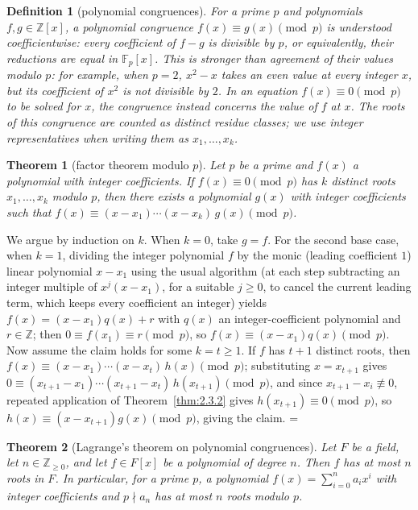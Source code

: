 \documentclass[11pt]{article}
\makeatletter
\theoremstyle{ntstyle}
\newtheorem{theorem}{Theorem}[subsection]
\newtheorem{definition}{Definition}[subsection]
\let\nt@closedisplay\]
\def\nt@guardedclose{\@ifnextchar\par{\nt@closeafterpar}{\@ifnextchar\end{\postdisplaypenalty\@M\nt@closedisplay}{\nt@closedisplay}}}
\def\nt@closeafterpar\par{\@ifnextchar\par{\nt@closeafterpar}{\@ifnextchar\end{\postdisplaypenalty\@M\nt@closedisplay\par}{\nt@closedisplay\par}}}
\renewenvironment{proof}[1][\proofname]{\par
  \pushQED{\qed}\normalfont\topsep\medskipamount\edef\nt@afterproof{\@endparpenalty=\the\@endparpenalty\relax}\@beginparpenalty\@M\@endparpenalty\@M\let\]\nt@guardedclose\trivlist\item[]\textit{#1\@addpunct{.}} \ignorespaces}{\ifvmode\addpenalty\@M\fi\popQED\nt@afterproof\endtrivlist\@endpefalse}
\makeatother
\begin{document}
\begin{definition}[polynomial congruences]\label{def:3.6.1}
	For a prime $p$ and polynomials $f,g\in\mathbb{Z}[x]$, a polynomial congruence
	$f(x)\equiv g(x)\pmod{p}$ is understood coefficientwise: every coefficient
	of $f-g$ is divisible by $p$, or equivalently, their reductions are equal
	in $\mathbb{F}_p[x]$. This is stronger than agreement of their values
	modulo $p$: for example, when $p=2$, $x^2-x$ takes an even value at every integer $x$, but its
	coefficient of $x^2$ is not divisible by $2$. In an equation
	$f(x)\equiv0\pmod{p}$ to be solved for $x$, the congruence instead concerns
	the value of $f$ at $x$. The roots of this congruence are counted as distinct residue classes;
	we use integer representatives when writing them as $x_1,\ldots,x_k$.
\end{definition}

\begin{theorem}[factor theorem modulo $p$]\label{thm:3.6.1} Let $p$ be a prime and $f(x)$ a
	polynomial with integer coefficients. If $f(x) \equiv 0 \pmod{p}$ has
	$k$ distinct roots $x_1, \ldots, x_k$ modulo $p$, then there exists a
	polynomial $g(x)$ with integer coefficients such that $f(x) \equiv (x
		- x_1) \cdots (x - x_k)\, g(x) \pmod{p}$.
\end{theorem}

\begin{proof} We argue by induction on $k$. When $k=0$,
	take $g=f$. For the second base case, when $k=1$, dividing the integer
	polynomial $f$ by the monic (leading coefficient $1$) linear
	polynomial $x - x_1$ using the usual algorithm (at each step subtracting an integer multiple of
	$x^{j}(x - x_1)$, for a suitable $j \ge 0$, to cancel the current leading term, which keeps every
	coefficient an integer) yields
	$f(x) = (x - x_1) q(x) + r$ with $q(x)$ an integer-coefficient
	polynomial and $r \in \mathbb{Z}$; then $0 \equiv
		f(x_1) \equiv r \pmod{p}$, so $f(x) \equiv (x - x_1) q(x) \pmod{p}$.
	Now assume the claim holds for some $k = t\ge1$. If $f$ has $t+1$
	distinct roots, then $f(x) \equiv (x - x_1) \cdots (x - x_t)\, h(x)
		\pmod{p}$; substituting $x = x_{t+1}$ gives $0 \equiv (x_{t+1} - x_1)
		\cdots (x_{t+1} - x_t)\, h(x_{t+1}) \pmod{p}$, and since $x_{t+1} -
		x_i \not\equiv 0$, repeated application of Theorem~\ref{thm:2.3.2} gives $h(x_{t+1}) \equiv 0 \pmod{p}$, so
	$h(x) \equiv (x - x_{t+1}) g(x) \pmod{p}$, giving the claim.
\end{proof}
\begin{theorem}[Lagrange's theorem on polynomial congruences]\label{thm:3.6.2} Let $F$ be a
	field, let $n\in\mathbb{Z}_{\ge0}$, and let $f\in F[x]$ be a polynomial of degree $n$. Then $f$
	has at most $n$ roots in $F$. In particular,
	for a prime $p$, a polynomial $f(x)=\sum_{i=0}^{n} a_i x^{i}$ with integer
	coefficients and $p \nmid a_n$ has at most $n$ roots modulo $p$.
\end{theorem}
\end{document}
